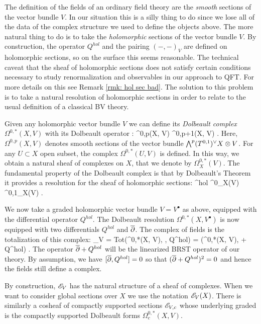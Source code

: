 \documentclass[10pt]{amsart}
\begin{document}
The definition of the fields of an ordinary field theory are the {\em smooth} sections of the vector bundle $V$. 
In our situation this is a silly thing to do since we lose all of the data of the complex structure we used to define the objects above.
The more natural thing to do is to take the {\em holomorphic} sections of the vector bundle $V$. 
By construction, the operator $Q^{hol}$ and the pairing $(-,-)_V$ are defined on holomorphic sections, so on the surface this seems reasonable.
The technical caveat that the sheaf of holomorphic sections does not satisfy certain conditions necessary to study renormalization and observables in our approach to QFT. 
For more details on this see Remark \ref{rmk: hol sec bad}.
The solution to this problem is to take a natural resolution of holomorphic sections in order to relate to the usual definition of a classical BV theory.

Given any holomorphic vector bundle $V$ we can define its {\em Dolbeault complex} $\Omega^{0,*}(X , V)$ with its Dolbeault operator 
\ben
\dbar : \Omega^{0,p}(X, V) \to \Omega^{0,p+1}(X, V) .
\een
Here, $\Omega^{0,p}(X, V)$ denotes smooth sections of the vector bundle $\bigwedge^p (T^{0,1})^{\vee} X \otimes V$. 
For any $U \subset X$ open subset, the complex $\Omega^{0,*}(U,V)$ is defined. 
In this way, we obtain a natural sheaf of complexes on $X$, that we denote by $\Omega^{0,*}_X(V)$. 
The fundamental property of the Dolbeault complex is that by Dolbeault's Theorem it provides a resolution for the sheaf of holomorphic sections: 
\ben
\sV^{hol} \to \Omega^0_X(V) \xto{\dbar} \Omega^{0,1}_X(V) \xto{\dbar} \cdots .
\een 

We now take a graded holomorphic vector bundle $V = V^{\bullet}$ as above, equipped with the differential operator $Q^{hol}$. 
The Dolbeault resolution $\Omega^{0,*}(X, V^\bullet)$ is now equipped with two differentials $Q^{hol}$ and $\overline{\partial}$. 
The complex of fields is the totalization of this complex:
\ben
\sE_V = {\rm Tot}\left(\Omega^{0,*}(X, V), \dbar, Q^{hol}\right) = \left(\Omega^{0,*}(X, V), \dbar + Q^{hol}\right) .
\een
The operator $\overline{\partial} + Q^{hol}$ will be the linearized BRST operator of our theory.
By assumption, we have $[\overline{\partial}, Q^{hol}] = 0$ so that $(\overline{\partial} + Q^{hol})^2 = 0$ and hence the fields still define a complex. 

By construction, $\mathscr E_V$ has the natural structure of a sheaf of complexes.
When we want to consider global sections over $X$ we use the notation $\mathscr E_V(X)$. 
There is similarly a cosheaf of compactly supported sections $\mathscr E_{V,c}$ whose underlying graded is the compactly supported Dolbeault forms $\Omega^{0,*}_c(X, V)$. 
\end{document}
